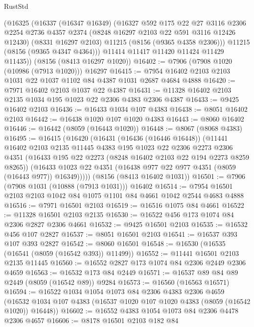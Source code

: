 \begin{lexlean}{RustStd}
\begin{coremodule}
      (@16325
        (@16337
          (@16347 @16349)
          (@16327
            @592
            @175
            @22
            @27
            @3116
            @2306
            @2254
            @2736
            @4357
            @2374
            (@8248 @16297 @2103 @22 @591 @3116 @12426 @12430)
            (@8331 @16297 @2103)
            @11215
            (@8156 (@9365 @4358 @2306)))
          @11215
          (@8156 (@9365 @4347 @4364)))
        @11414
        @11417
        @11420
        @11424
        @11429
        @11435))
    (@8156 (@8413 @16297 @1020))
@16402 := @7906 (@7908 @1020 (@10986 (@7913 @1020))) @16297
@16415 := @7954 @16402 @2103 @2103 @1031 @22 @1037 @1102 @84 @4387 @1031 @2687 @4684 @4888
@16420 := @7971 @16402 @2103 @1037 @22 @4387
@16431 := @11328 @16402 @2103 @2135 @1034 @195 @1023 @22 @2306 @4383 @2306 @4387
@16433 := @9425 @16402 @2103
@16436 := @16433 @1034 @107 @4383
@16438 := @8051 @16402 @2103
@16442 := @16438 @1020 @107 @1020 @4383
@16443 := @8060 @16402
@16446 := @16442 (@8059 (@16443 @1020))
@16448 := @8067 (@8068 @4383)
@16495 := @16415
    (@16420
      (@16431
        (@16436 (@16446 @16448))
        (@11441
          @16402
          @2103
          @2135
          @11445
          @4383
          @195
          @1023
          @22
          @2306
          @2273
          @2306
          @4351
          (@16433 @195 @22 @2273 (@8248 @16402 @2103 @22 @194 @2273 @8259 @8265))
          (@16433 @1023 @22 @4351 (@16438 @977 @22 @977 @4351 (@8059 (@16443 @977)) @16349)))))
    (@8156 (@8413 @16402 @1031))
@16501 := @7906 (@7908 @1031 (@10888 (@7913 @1031))) @16402
@16514 := @7954 @16501 @2103 @2103 @1042 @84 @1075 @1101 @84 @4661 @1042 @2544 @4683 @4888
@16516 := @7971 @16501 @2103
@16519 := @16516 @1075 @84 @4661
@16522 := @11328 @16501 @2103 @2135
@16530 := @16522 @456 @173 @1074 @84 @2306 @2827 @2306 @4661
@16532 := @9425 @16501 @2103
@16535 := @16532 @456 @107 @2827
@16537 := @8051 @16501 @2103
@16541 := @16537 @393 @107 @393 @2827
@16542 := @8060 @16501
@16548 := @16530 (@16535 (@16541 (@8059 (@16542 @393)) @11499))
@16552 := @11441 @16501 @2103 @2135 @11445
@16560 := @16552 @2827 @173 @1074 @84 @2306 @2449 @2306 @4659
@16563 := @16532 @173 @84 @2449
@16571 := @16537 @89 @84 @89 @2449 (@8059 (@16542 @89)) @9284
@16573 := @16560 (@16563 @16571)
@16594 := @16522
    @1034
    @1054
    @1073
    @84
    @2306
    @4383
    @2306
    @4659
    (@16532 @1034 @107 @4383 (@16537 @1020 @107 @1020 @4383 (@8059 (@16542 @1020)) @16448))
@16602 := @16552 @4383 @1054 @1073 @84 @2306 @4478 @2306 @4657
@16606 := @8178 @16501 @2103 @182 @84

\end{coremodule}
\end{lexlean}
